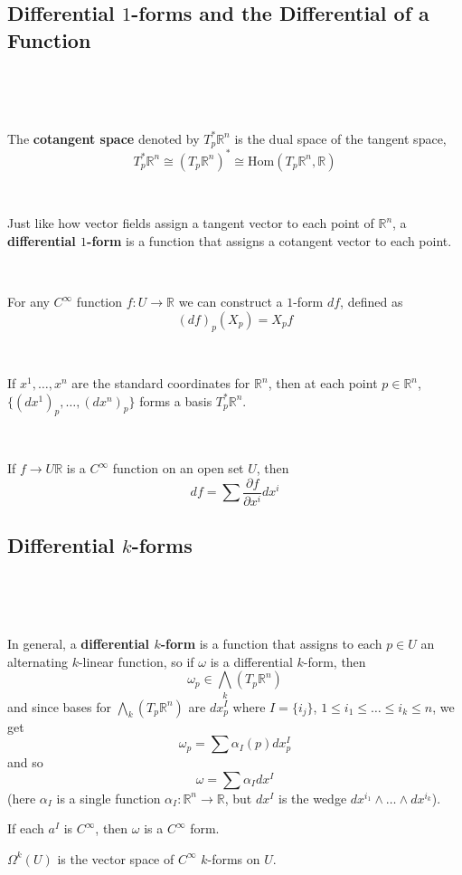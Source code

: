 \documentclass{article}
\begin{document}
\subsection{Differential $1$-forms and the Differential of a Function}
\

\begin{definition}
  \

  The \textbf{cotangent space} denoted by $T^*_p \mathbb{R}^n$ is the dual space of the tangent space, $$T^*_p \mathbb{R}^n \cong (T_p \mathbb{R}^n)^* \cong \text{Hom}(T_p \mathbb{R}^n, \mathbb{R})$$
\end{definition}

\begin{definition}
  \

  Just like how vector fields assign a tangent vector to each point of $\mathbb{R}^n$, a \textbf{differential $1$-form} is a function that assigns a cotangent vector to each point.
\end{definition}

\begin{example}
  \

  For any $C^\infty$ function $f: U \to \mathbb{R}$ we can construct a $1$-form $df$, defined as $$(df)_p(X_p) = X_pf$$
\end{example}

\begin{proposition}
  \

  If $x^1, \dots, x^n$ are the standard coordinates for $\mathbb{R}^n$, then at each point $p \in \mathbb{R}^n$, $\{(dx^1)_p, \dots, (dx^n)_p\}$ forms a basis $T^*_p \mathbb{R}^n$.
\end{proposition}

\begin{proposition}
  \

  If $f \to U \mathbb{R}$ is a $C^\infty$ function on an open set $U$, then $$df = \sum \frac{\partial f}{\partial x^i} dx^i$$
\end{proposition}

\subsection{Differential $k$-forms}
\

\begin{definition}
  \

  In general, a \textbf{differential $k$-form} is a function that assigns to each $p \in U$ an alternating $k$-linear function, so if $\omega$ is a differential $k$-form, then $$\omega_p \in \bigwedge_k(T_p \mathbb{R}^n)$$and since bases for $\bigwedge_k(T_p \mathbb{R}^n)$ are $dx_p^I$ where $I = \{i_j\}$, $1 \leq i_1\leq \dots \leq i_k \leq n$, we get $$\omega_p = \sum \alpha_I(p) dx^I_p$$and so $$\omega = \sum \alpha_Idx^I$$(here $\alpha_I$ is a single function $\alpha_I: \mathbb{R}^n \to \mathbb{R}$, but $dx^I$ is the wedge $dx^{i_1} \wedge \dots \wedge dx^{i_k}$).

  If each $a^I$ is $C^\infty$, then $\omega$ is a $C^\infty$ form.

  $\Omega^k(U)$ is the vector space of $C^\infty$ $k$-forms on $U$.
\end{definition}
\end{document}

